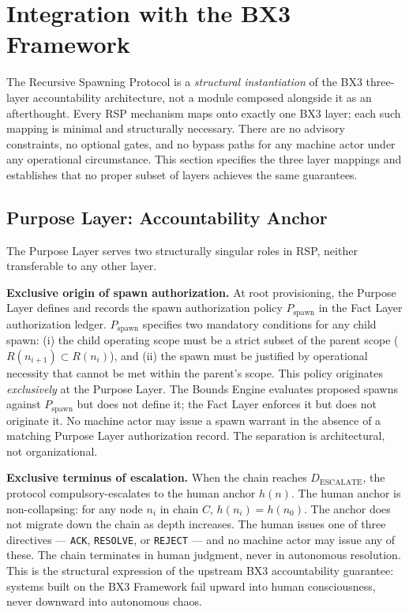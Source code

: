 \section{Integration with the BX3 Framework}
\label{sec:rs-integration}

The Recursive Spawning Protocol is a \emph{structural instantiation} of the BX3 three-layer accountability architecture, not a module composed alongside it as an afterthought. Every RSP mechanism maps onto exactly one BX3 layer; each such mapping is minimal and structurally necessary. There are no advisory constraints, no optional gates, and no bypass paths for any machine actor under any operational circumstance. This section specifies the three layer mappings and establishes that no proper subset of layers achieves the same guarantees.

\subsection{Purpose Layer: Accountability Anchor}
\label{sec:rs-purpose-anchor}

The Purpose Layer serves two structurally singular roles in RSP, neither transferable to any other layer.

\medskip
\noindent\textbf{Exclusive origin of spawn authorization.} At root provisioning, the Purpose Layer defines and records the spawn authorization policy $P_{\mathrm{spawn}}$ in the Fact Layer authorization ledger. $P_{\mathrm{spawn}}$ specifies two mandatory conditions for any child spawn: (i) the child operating scope must be a strict subset of the parent scope ($R(n_{i+1}) \subset R(n_i)$), and (ii) the spawn must be justified by operational necessity that cannot be met within the parent's scope. This policy originates \emph{exclusively} at the Purpose Layer. The Bounds Engine evaluates proposed spawns against $P_{\mathrm{spawn}}$ but does not define it; the Fact Layer enforces it but does not originate it. No machine actor may issue a spawn warrant in the absence of a matching Purpose Layer authorization record. The separation is architectural, not organizational.

\medskip
\noindent\textbf{Exclusive terminus of escalation.} When the chain reaches $D_{\mathrm{ESCALATE}}$, the protocol compulsory-escalates to the human anchor $h(n)$. The human anchor is non-collapsing: for any node $n_i$ in chain $C$, $h(n_i) = h(n_0)$. The anchor does not migrate down the chain as depth increases. The human issues one of three directives --- \texttt{ACK}, \texttt{RESOLVE}, or \texttt{REJECT} --- and no machine actor may issue any of these. The chain terminates in human judgment, never in autonomous resolution. This is the structural expression of the upstream BX3 accountability guarantee: systems built on the BX3 Framework fail upward into human consciousness, never downward into autonomous chaos.

